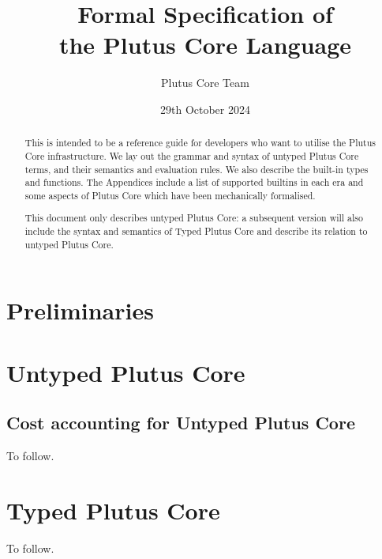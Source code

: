 \documentclass[a4paper]{report}
\title{Formal Specification of\\the Plutus Core Language\\
  \vspace{5mm}
  \LARGE{\red{\textsf{DRAFT}}}
}
\date{29th October 2024}
\author{Plutus Core Team}
\begin{document}
\maketitle

\begin{abstract}
  This is intended to be a reference guide for developers who want to utilise
  the Plutus Core infrastructure.  We lay out the grammar and syntax of untyped
  Plutus Core terms, and their semantics and evaluation rules.  We also describe
  the built-in types and functions.  The Appendices include a list of supported
  builtins in each era and some aspects of Plutus Core which have been
  mechanically formalised.

  This document only describes untyped Plutus Core: a subsequent version will also
  include the syntax and semantics of Typed Plutus Core and describe its relation to
  untyped Plutus Core.
\end{abstract}

\newpage
\tableofcontents
\newpage



\chapter{Preliminaries}


\chapter{Untyped Plutus Core}



\section{Cost accounting for Untyped Plutus Core}
To follow.
\chapter{Typed Plutus Core}
To follow.

\begin{appendices}



\end{appendices}

\newpage


\newpage
\printnomenclature[2cm]  %
\end{document}

